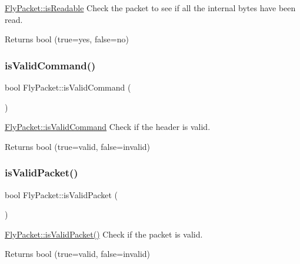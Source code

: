 \hyperlink{class_fly_packet_a9c1a141b4b44004015618da46829200d}{Fly\+Packet\+::is\+Readable} Check the packet to see if all the internal bytes have been read. 

\begin{DoxyReturn}{Returns}
bool (true=yes, false=no) 
\end{DoxyReturn}
\hypertarget{class_fly_packet_a32bdd283c8d5961adb20524a14269224}{}\label{class_fly_packet_a32bdd283c8d5961adb20524a14269224} 
\subsubsection{\texorpdfstring{is\+Valid\+Command()}{isValidCommand()}}
{\footnotesize\ttfamily bool Fly\+Packet\+::is\+Valid\+Command (\begin{DoxyParamCaption}{ }\end{DoxyParamCaption})}



\hyperlink{class_fly_packet_a32bdd283c8d5961adb20524a14269224}{Fly\+Packet\+::is\+Valid\+Command} Check if the header is valid. 

\begin{DoxyReturn}{Returns}
bool (true=valid, false=invalid) 
\end{DoxyReturn}
\hypertarget{class_fly_packet_a71175af24ccf498579c804aa21500db5}{}\label{class_fly_packet_a71175af24ccf498579c804aa21500db5} 
\subsubsection{\texorpdfstring{is\+Valid\+Packet()}{isValidPacket()}}
{\footnotesize\ttfamily bool Fly\+Packet\+::is\+Valid\+Packet (\begin{DoxyParamCaption}{ }\end{DoxyParamCaption})}



\hyperlink{class_fly_packet_a71175af24ccf498579c804aa21500db5}{Fly\+Packet\+::is\+Valid\+Packet()} Check if the packet is valid. 

\begin{DoxyReturn}{Returns}
bool (true=valid, false=invalid) 
\end{DoxyReturn}
\hypertarget{class_fly_packet_a1e63a54895660739a5232b5b546fcf07}{}\label{class_fly_packet_a1e63a54895660739a5232b5b546fcf07} 
